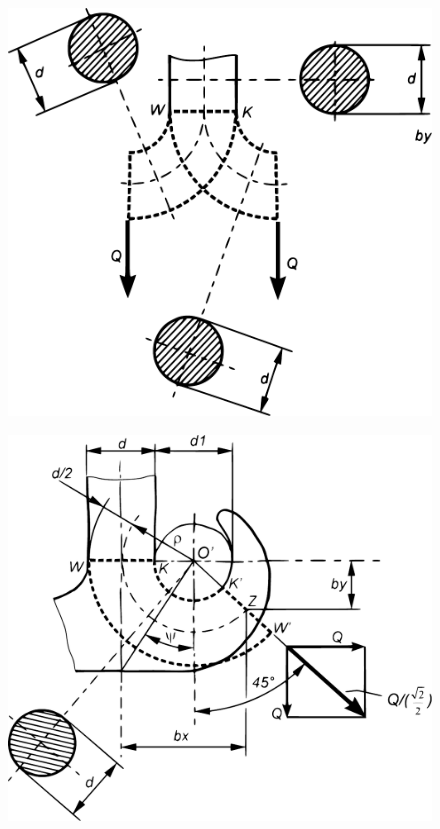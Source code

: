 \begin{figure}[H]
\centering
\begin{minipage}{.47\textwidth}
  \centering
  \includegraphics[width=.9\linewidth]{imgs/Cap5/96 SolidoFitt3}
  \label{fig:Carr1}
\end{minipage}%
\begin{minipage}{.47\textwidth}
  \centering
  \includegraphics[width=.9\linewidth]{imgs/Cap5/SolidoFittGambo}
  \label{fig:Carr2}
\end{minipage}
\end{figure}
